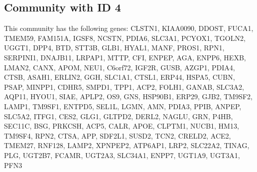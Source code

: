 \subsection*{Community with ID 4}
This community has the following genes: CLSTN1, KIAA0090, DDOST, FUCA1, TMEM59, FAM151A, IGSF8, NCSTN, PDIA6, SLC3A1, PCYOX1, TGOLN2, UGGT1, DPP4, BTD, STT3B, GLB1, HYAL1, MANF, PROS1, RPN1, SERPINI1, DNAJB11, LRPAP1, MTTP, CFI, ENPEP, AGA, ENPP6, HEXB, LMAN2, CANX, APOM, NEU1, C6orf72, IGF2R, GUSB, AZGP1, PDIA4, CTSB, ASAH1, ERLIN2, GGH, SLC1A1, CTSL1, ERP44, HSPA5, CUBN, PSAP, MINPP1, CDHR5, SMPD1, TPP1, ACP2, FOLH1, GANAB, SLC3A2, AQP11, HYOU1, SIAE, APLP2, OS9, GNS, HSP90B1, ERP29, GJB2, TM9SF2, LAMP1, TM9SF1, ENTPD5, SEL1L, LGMN, AMN, PDIA3, PPIB, ANPEP, SLC5A2, ITFG1, CES2, GLG1, GLTPD2, DERL2, NAGLU, GRN, P4HB, SEC11C, BSG, PRKCSH, ACP5, CALR, APOE, CLPTM1, NUCB1, HM13, TM9SF4, RPN2, CTSA, APP, SDF2L1, SUSD2, TCN2, CRELD2, ACE2, TMEM27, RNF128, LAMP2, XPNPEP2, ATP6AP1, LRP2, SLC22A2, TINAG, PLG, UGT2B7, FCAMR, UGT2A3, SLC34A1, ENPP7, UGT1A9, UGT3A1, PFN3
\\
